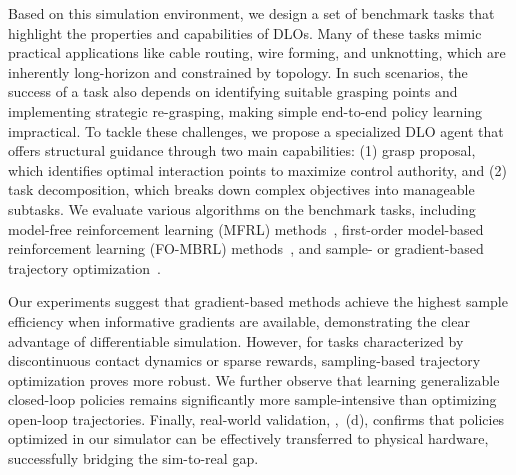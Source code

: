 Based on this simulation environment, we design a set of benchmark tasks that highlight the properties and capabilities of DLOs. Many of these tasks mimic practical applications like cable routing, wire forming, and unknotting, which are inherently long-horizon and constrained by topology. In such scenarios, the success of a task also depends on identifying suitable grasping points and implementing strategic re-grasping, making simple end-to-end policy learning impractical.
To tackle these challenges, we propose a specialized DLO agent that offers structural guidance through two main capabilities: (1) grasp proposal, which identifies optimal interaction points to maximize control authority, and (2) task decomposition, which breaks down complex objectives into manageable subtasks. We evaluate various algorithms on the benchmark tasks, including model-free reinforcement learning (MFRL) methods~\citep{schulman2017proximal,haarnoja2018soft}, first-order model-based reinforcement learning (FO-MBRL) methods~\citep{xingstabilizing,xuaccelerated}, and sample- or gradient-based trajectory optimization~\citep{cmaes}. 

Our experiments suggest that gradient-based methods achieve the highest sample efficiency when informative gradients are available, demonstrating the clear advantage of differentiable simulation. However, for tasks characterized by discontinuous contact dynamics or sparse rewards, sampling-based trajectory optimization proves more robust. We further observe that learning generalizable closed-loop policies remains significantly more sample-intensive than optimizing open-loop trajectories. Finally, real-world validation, \eg,~(d), confirms that policies optimized in our simulator can be effectively transferred to physical hardware, successfully bridging the sim-to-real gap.

